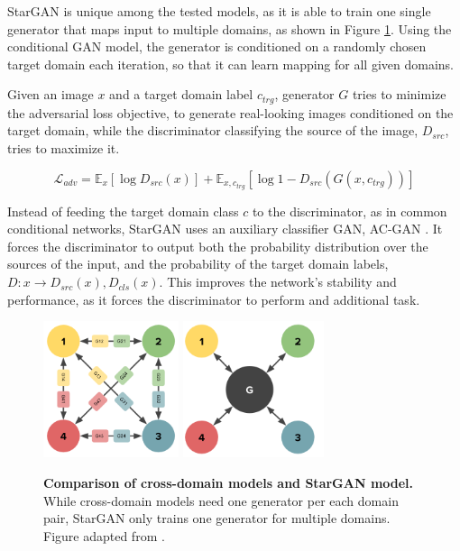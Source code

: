\documentclass{article}
\begin{document}
StarGAN \cite{choi_stargan:_2017} is unique among the tested models, as it is able to train one single generator that maps input to multiple domains, as shown in Figure \ref{fig:stargan_topo}. Using the conditional GAN model, the generator is conditioned on a randomly chosen target domain each iteration, so that it can learn mapping for all given domains. 

Given an image $x$ and a target domain label $c_{trg}$, generator $G$ tries to minimize the adversarial loss objective, to generate real-looking images conditioned on the target domain, while the discriminator classifying the source of the image, $D_{src}$, tries to maximize it.

\begin{equation}
\mathcal{L}_{adv} = \mathbb{E}_{x}[\log D_{src}(x)] + \mathbb{E}_{x, c_{trg}}[\log 1 - D_{src}(G(x, c_{trg}))]
\label{eq:stargan_adv}
\end{equation}


Instead of feeding the target domain class $c$ to the discriminator, as in common conditional networks, StarGAN uses an auxiliary classifier GAN, AC-GAN \cite{odena_conditional_2016}. It forces the discriminator to output both the probability distribution over the sources of the input, and the probability of the target domain labels, $D: x \rightarrow {D_{src}(x), D_{cls}(x)}$. This improves the network's stability and performance, as it forces the discriminator to perform and additional task.

\begin{figure}[t]
\centering
{}
{\includegraphics[height=4cm]{StarGAN_graph}}\hspace{1cm}
{\includegraphics[height=4cm]{StarGAN_graph2}}
\caption{\label{fig:stargan_topo} \textbf{Comparison of cross-domain models and StarGAN model.} While cross-domain models need one generator per each domain pair, StarGAN only trains one generator for multiple domains. Figure adapted from \cite{choi_stargan:_2017}.}
\end{figure}
\end{document}
